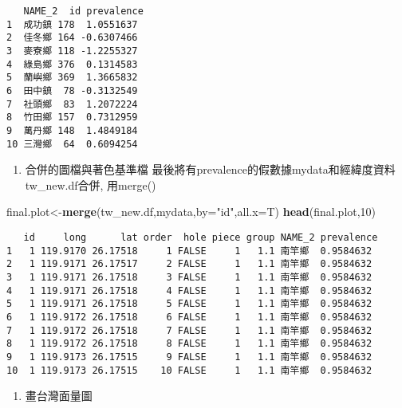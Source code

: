 \documentclass[
]{book}
\newenvironment{Shaded}{\begin{snugshade}}{\end{snugshade}}
\newcommand{\DataTypeTok}[1]{\textcolor[rgb]{0.13,0.29,0.53}{#1}}
\newcommand{\DecValTok}[1]{\textcolor[rgb]{0.00,0.00,0.81}{#1}}
\newcommand{\KeywordTok}[1]{\textcolor[rgb]{0.13,0.29,0.53}{\textbf{#1}}}
\newcommand{\NormalTok}[1]{#1}
\newcommand{\StringTok}[1]{\textcolor[rgb]{0.31,0.60,0.02}{#1}}
\providecommand{\tightlist}{%
  \setlength{\itemsep}{0pt}\setlength{\parskip}{0pt}}
\begin{document}
\begin{verbatim}
   NAME_2  id prevalence
1  成功鎮 178  1.0551637
2  佳冬鄉 164 -0.6307466
3  麥寮鄉 118 -1.2255327
4  綠島鄉 376  0.1314583
5  蘭嶼鄉 369  1.3665832
6  田中鎮  78 -0.3132549
7  社頭鄉  83  1.2072224
8  竹田鄉 157  0.7312959
9  萬丹鄉 148  1.4849184
10 三灣鄉  64  0.6094254
\end{verbatim}

\begin{enumerate}
\def\labelenumi{\arabic{enumi}.}
\setcounter{enumi}{3}
\tightlist
\item
  合併的圖檔與著色基準檔
  最後將有prevalence的假數據mydata和經緯度資料tw\_new.df合併, 用merge()
\end{enumerate}

\begin{Shaded}
\begin{Highlighting}[]
\NormalTok{final.plot<-}\KeywordTok{merge}\NormalTok{(tw_new.df,mydata,}\DataTypeTok{by=}\StringTok{"id"}\NormalTok{,}\DataTypeTok{all.x=}\NormalTok{T)}
\KeywordTok{head}\NormalTok{(final.plot,}\DecValTok{10}\NormalTok{)}
\end{Highlighting}
\end{Shaded}

\begin{verbatim}
   id     long      lat order  hole piece group NAME_2 prevalence
1   1 119.9170 26.17518     1 FALSE     1   1.1 南竿鄉  0.9584632
2   1 119.9171 26.17517     2 FALSE     1   1.1 南竿鄉  0.9584632
3   1 119.9171 26.17518     3 FALSE     1   1.1 南竿鄉  0.9584632
4   1 119.9171 26.17518     4 FALSE     1   1.1 南竿鄉  0.9584632
5   1 119.9171 26.17518     5 FALSE     1   1.1 南竿鄉  0.9584632
6   1 119.9172 26.17518     6 FALSE     1   1.1 南竿鄉  0.9584632
7   1 119.9172 26.17518     7 FALSE     1   1.1 南竿鄉  0.9584632
8   1 119.9172 26.17518     8 FALSE     1   1.1 南竿鄉  0.9584632
9   1 119.9173 26.17515     9 FALSE     1   1.1 南竿鄉  0.9584632
10  1 119.9173 26.17515    10 FALSE     1   1.1 南竿鄉  0.9584632
\end{verbatim}

\begin{enumerate}
\def\labelenumi{\arabic{enumi}.}
\setcounter{enumi}{4}
\tightlist
\item
  畫台灣面量圖
\end{enumerate}
\end{document}
